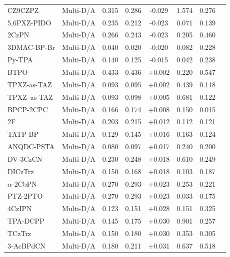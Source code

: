 \begin{longtable}{llcccccc}
CZ9CZPZ & Multi-D/A & 0.315 & 0.286 & -0.029 & 1.574 & 0.276 & \cite{doi101016jcej2020127591} \\
5,6PXZ-PIDO & Multi-D/A & 0.235 & 0.212 & -0.023 & 0.071 & 0.139 & \cite{doi101039C8TC01656A} \\
2CzPN & Multi-D/A & 0.266 & 0.243 & -0.023 & 0.205 & 0.460 & \cite{doi101039D1TC05696D} \\
3DMAC-BP-Br & Multi-D/A & 0.040 & 0.020 & -0.020 & 0.082 & 0.228 & \cite{doi101016jdyepig2021109731} \\
Py-TPA & Multi-D/A & 0.140 & 0.125 & -0.015 & 0.042 & 0.238 & \cite{doi101016jcej2022139534} \\
BTPO & Multi-D/A & 0.433 & 0.436 & +0.002 & 0.220 & 0.547 & \cite{doi101039D1SC04118E} \\
TPXZ-as-TAZ & Multi-D/A & 0.093 & 0.095 & +0.002 & 0.439 & 0.118 & \cite{doi101016jsaa201805032} \\
TPXZ--as-TAZ & Multi-D/A & 0.093 & 0.098 & +0.005 & 0.681 & 0.122 & \cite{doi101016jsaa201805032} \\
BPCP-2CPC & Multi-D/A & 0.166 & 0.174 & +0.008 & 0.150 & 0.015 & \cite{doi101039C9CC05391C} \\
2F & Multi-D/A & 0.203 & 0.215 & +0.012 & 0.112 & 0.121 & \cite{doi101039C7CP02615C} \\
TATP-BP & Multi-D/A & 0.129 & 0.145 & +0.016 & 0.163 & 0.124 & \cite{doi101039C8TC04721A} \\
ANQDC-PSTA & Multi-D/A & 0.080 & 0.097 & +0.017 & 0.240 & 0.200 & \cite{doi101016jcej2020126663} \\
DV-3CzCN & Multi-D/A & 0.230 & 0.248 & +0.018 & 0.610 & 0.249 & \cite{doi101016jdyepig2021109967} \\
DICzTrz & Multi-D/A & 0.150 & 0.168 & +0.018 & 0.103 & 0.187 & \cite{doi101039C9TC05855A} \\
$\alpha$-2CbPN & Multi-D/A & 0.270 & 0.293 & +0.023 & 0.253 & 0.221 & \cite{doi101039C6MH00579A} \\
PTZ-2PTO & Multi-D/A & 0.270 & 0.293 & +0.023 & 0.033 & 0.175 & \cite{doi101016jdyepig2019107636} \\
4CzIPN & Multi-D/A & 0.123 & 0.151 & +0.028 & 0.151 & 0.325 & \cite{doi101039C6TC00214E} \\
TPA-DCPP & Multi-D/A & 0.145 & 0.175 & +0.030 & 0.901 & 0.257 & \cite{doi101039D1TC05906H} \\
TCzTrz & Multi-D/A & 0.150 & 0.180 & +0.030 & 0.353 & 0.305 & \cite{doi101039C6MH00579A} \\
3-AcBPdCN & Multi-D/A & 0.180 & 0.211 & +0.031 & 0.637 & 0.518 & \cite{doi101016jcej2021134216} \\

\end{longtable}
